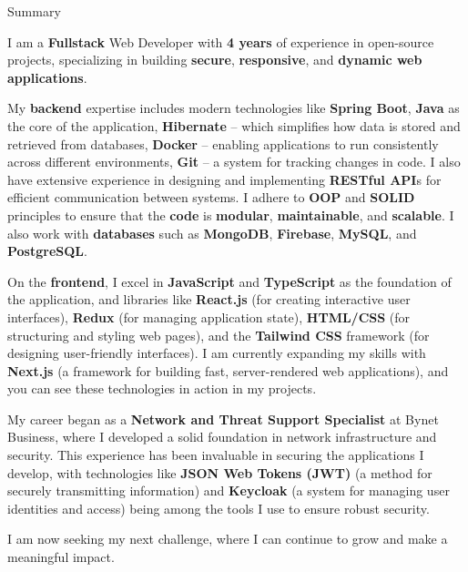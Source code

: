 \documentclass{resume}
\begin{document}
\begin{rSection}{Summary}


I am a \textbf{Fullstack} Web Developer with \textbf{4 years} of experience in open-source projects, specializing in building \textbf{secure}, \textbf{responsive}, and \textbf{dynamic web applications}.

My \textbf{backend} expertise includes modern technologies like \textbf{Spring Boot}, \textbf{Java} as the core of the application, \textbf{Hibernate} – which simplifies how data is stored and retrieved from databases, \textbf{Docker} – enabling applications to run consistently across different environments, \textbf{Git} – a system for tracking changes in code. I also have extensive experience in designing and implementing \textbf{RESTful API}s for efficient communication between systems. I adhere to \textbf{OOP} and \textbf{SOLID} principles to ensure that the \textbf{code} is \textbf{modular}, \textbf{maintainable}, and \textbf{scalable}. I also work with \textbf{databases} such as \textbf{MongoDB}, \textbf{Firebase}, \textbf{MySQL}, and \textbf{PostgreSQL}.

On the \textbf{frontend}, I excel in \textbf{JavaScript} and \textbf{TypeScript} as the foundation of the application, and libraries like \textbf{React.js} (for creating interactive user interfaces), \textbf{Redux} (for managing application state), \textbf{ HTML/CSS} (for structuring and styling web pages), and the \textbf{Tailwind CSS} framework (for designing user-friendly interfaces). I am currently expanding my skills with \textbf{Next.js} (a framework for building fast, server-rendered web applications), and you can see these technologies in action in my projects.

My career began as a \textbf{Network and Threat Support Specialist} at Bynet Business, where I developed a solid foundation in network infrastructure and security. This experience has been invaluable in securing the applications I develop, with technologies like \textbf{JSON Web Tokens (JWT)} (a method for securely transmitting information) and \textbf{Keycloak} (a system for managing user identities and access) being among the tools I use to ensure robust security.

I am now seeking my next challenge, where I can continue to grow and make a meaningful impact.
\end{rSection}
\end{document}
